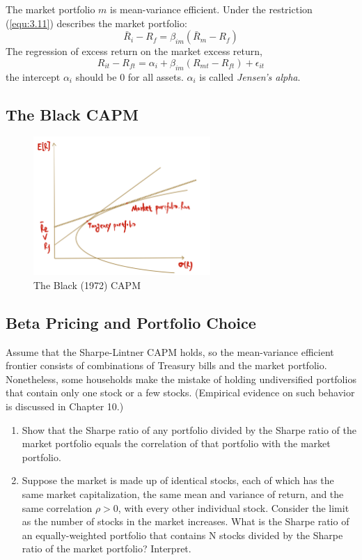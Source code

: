 \documentclass[11pt,green,twocol,citestyle=authoryear, bibstyle=authoryear]{elegantbook}
\begin{document}
The market portfolio $ m $ is mean-variance efficient. Under the restriction (\ref{equ:3.11}) describes the market portfolio:
\begin{equation}\label{equ:3.12}
    \bar{R}_i-R_f=\beta_{i m}\left(\bar{R}_m-R_f\right)
\end{equation}
The regression of excess return on the market excess return,
\begin{equation}\label{equ:3.13}
    R_{i t}-R_{f t}=\alpha_i+\beta_{i m}\left(R_{m t}-R_{f t}\right)+\epsilon_{i t}
\end{equation}
the intercept $ \alpha_i $ should be $ 0 $ for all assets. $ \alpha_i $ is called \textit{Jensen's alpha}.

\subsection{The Black CAPM}
\begin{figure}[!h]
    \centering
    \includegraphics[width = 0.6\textwidth]{blackcapm.pdf}
    \caption{The Black (1972) CAPM}
\end{figure}

\subsection{Beta Pricing and Portfolio Choice}

\begin{exercise}
    Assume that the Sharpe-Lintner CAPM holds, so the mean-variance efficient frontier consists of combinations of Treasury bills and the market portfolio. Nonetheless, some households make the mistake of holding undiversified portfolios that contain only one stock or a few stocks. (Empirical evidence on such behavior is discussed in Chapter 10.)
    \begin{enumerate}
        \item Show that the Sharpe ratio of any portfolio divided by the Sharpe ratio of the market
        portfolio equals the correlation of that portfolio with the market portfolio.
        \item Suppose the market is made up of identical stocks, each of which has the same market capitalization, the same mean and variance of return, and the same correlation $ \rho > 0 $, with every other individual stock. Consider the limit as the number of stocks
        in the market increases. What is the Sharpe ratio of an equally-weighted portfolio
        that contains N stocks divided by the Sharpe ratio of the market portfolio? Interpret.
    \end{enumerate}
\end{exercise}
\end{document}
